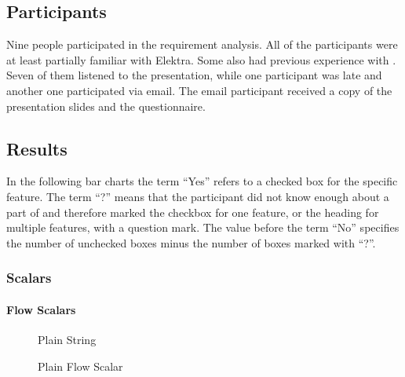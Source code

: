 \subsection{Participants}

Nine people participated in the requirement analysis. All of the participants were at least partially familiar with Elektra. Some also had previous experience with . Seven of them listened to the presentation, while one participant was late and another one participated via email. The email participant received a copy of the presentation slides and the questionnaire.

\subsection{Results}

In the following bar charts the term “Yes” refers to a checked box for the specific feature. The term “?” means that the participant did not know enough about a part of  and therefore marked the checkbox for one feature, or the heading for multiple features, with a question mark. The value before the term “No” specifies the number of unchecked boxes minus the number of boxes marked with “?”.

\subsubsection{Scalars}

\paragraph{Flow Scalars}

\begin{figure}[H]
  \begin{minipage}[t]{0.48\textwidth}
    \vspace{0pt}
    \begin{bchart}[max=9, width=0.85\textwidth]
    \end{bchart}
  \end{minipage}
  \begin{minipage}[t]{0.48\textwidth}
    \vspace{0pt}
    \begin{yamlcode}
      Plain String
    \end{yamlcode}
  \end{minipage}
  \caption{Plain Flow Scalar}
\end{figure}

